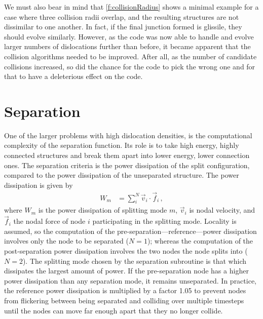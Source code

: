 We must also bear in mind that \cref{f:collisionRadius} shows a minimal example for a case where three collision radii overlap, and the resulting structures are not dissimilar to one another. In fact, if the final junction formed is glissile, they should evolve similarly. However, as the code was now able to handle and evolve larger numbers of dislocations further than before, it became apparent that the collision algorithms needed to be improved. After all, as the number of candidate collisions increased, so did the chance for the code to pick the wrong one and for that to have a deleterious effect on the code.

\section{Separation}\label{s:separation}

One of the larger problems with high dislocation densities, is the computational complexity of the separation function. Its role is to take high energy, highly connected structures and break them apart into lower energy, lower connection ones. The separation criteria is the power dissipation of the split configuration, compared to the power dissipation of the unseparated structure. The power dissipation is given by
\begin{align}\label{eq:powerDiss}
    W_m & = \sum\limits_i^N\vec{v}_i \cdot \vec{f}_i\,,
\end{align}
where $W_m$ is the power dissipation of splitting mode $m$, $\vec{v}_i$ is nodal velocity, and $\vec{f}_i$ the nodal force of node $i$ participating in the splitting mode. Locality is assumed, so the computation of the pre-separation---reference---power dissipation involves only the node to be separated ($N=1$); whereas the computation of the post-separation power dissipation involves the two nodes the node splits into ($N=2$). The splitting mode chosen by the separation subroutine is that which dissipates the largest amount of power. If the pre-separation node has a higher power dissipation than any separation mode, it remains unseparated. In practice, the reference power dissipation is multiplied by a factor 1.05 to prevent nodes from flickering between being separated and colliding over multiple timesteps until the nodes can move far enough apart that they no longer collide.

